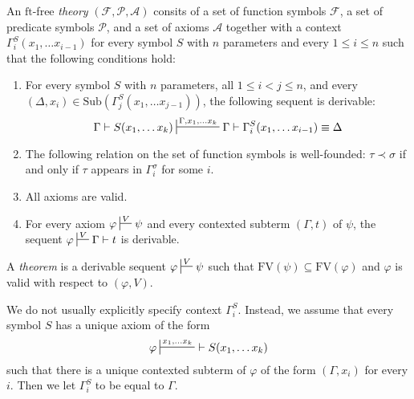 \documentclass[reqno]{amsart}
\theoremstyle{definition}
\theoremstyle{remark}
\newcommand{\fs}[1]{\mathrm{#1}}
\newcommand{\FV}{\fs{FV}}
\newcommand{\ft}{\fs{ft}}
\newcommand{\sub}{\fs{Sub}}
\numberwithin{figure}{section}
\begin{document}
\begin{defn}[ft-free]
An $\ft$-free \emph{theory} $(\mathcal{F},\mathcal{P},\mathcal{A})$ consits of a set of function symbols $\mathcal{F}$, a set of predicate symbols $\mathcal{P}$, and a set of axioms $\mathcal{A}$
together with a context $\Gamma^S_i(x_1, \ldots x_{i-1})$ for every symbol $S$ with $n$ parameters and every $1 \leq i \leq n$ such that the following conditions hold:
\begin{enumerate}
\item \label{it:ax-consist} For every symbol $S$ with $n$ parameters, all $1 \leq i < j \leq n$, and every $(\Delta,x_i) \in \sub(\Gamma_j^S(x_1, \ldots x_{j-1}))$, the following sequent is derivable:
\[ \Gamma \vdash S(x_1, \ldots x_k) \sststile{}{\Gamma, x_1, \ldots x_k} \Gamma \vdash \Gamma_i^S(x_1, \ldots x_{i-1}) \equiv \Delta \]
\item \label{it:ax-wf} The following relation on the set of function symbols is well-founded: $\tau \prec \sigma$ if and only if $\tau$ appears in $\Gamma^\sigma_i$ for some $i$.
\item \label{it:ax-valid} All axioms are valid.
\item \label{it:ax-cond} For every axiom $\varphi \sststile{}{V} \psi$ and every contexted subterm $(\Gamma,t)$ of $\psi$, the sequent $\varphi \sststile{}{V} \Gamma \vdash t$ is derivable.
\end{enumerate}
A \emph{theorem} is a derivable sequent $\varphi \sststile{}{V} \psi$ such that $\FV(\psi) \subseteq \FV(\varphi)$ and $\varphi$ is valid with respect to $(\varphi,V)$.
\end{defn}

We do not usually explicitly specify context $\Gamma^S_i$.
Instead, we assume that every symbol $S$ has a unique axiom of the form
\[ \varphi \sststile{}{x_1, \ldots x_k}\ \vdash S(x_1, \ldots x_k) \]
such that there is a unique contexted subterm of $\varphi$ of the form $(\Gamma,x_i)$ for every $i$.
Then we let $\Gamma^S_i$ to be equal to $\Gamma$.
\end{document}
